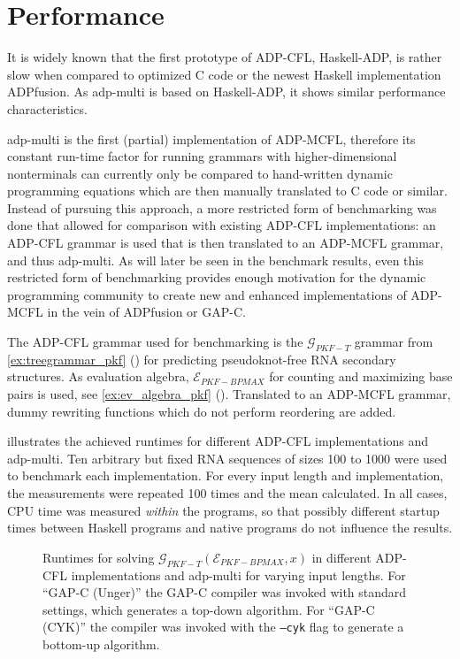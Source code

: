\documentclass[
    a4paper,
    12pt,
    twoside,
    BCOR=12mm,
    parskip=half,
    chapterprefix,
    numbers=noenddot,
    bibliography=totoc
]{scrbook}
\begin{document}
\section{Performance}
\label{sec:adpmulti_perf}

It is widely known that the first prototype of ADP-CFL, Haskell-ADP, is rather slow \citep{honer_zu_siederdissen_sneaking_2012} when compared to optimized C code or the newest Haskell implementation ADPfusion. As adp-multi is based on Haskell-ADP, it shows similar performance characteristics.

adp-multi is the first (partial) implementation of ADP-MCFL, therefore its constant run-time factor for running grammars with higher-dimensional nonterminals can currently only be compared to hand-written dynamic programming equations which are then manually translated to C code or similar. Instead of pursuing this approach, a more restricted form of benchmarking was done that allowed for comparison with existing ADP-CFL implementations: an ADP-CFL grammar is used that is then translated to an ADP-MCFL grammar, and thus adp-multi. As will later be seen in the benchmark results, even this restricted form of benchmarking provides enough motivation for the dynamic programming community to create new and enhanced implementations of ADP-MCFL in the vein of ADPfusion or GAP-C.

The ADP-CFL grammar used for benchmarking is the $\mathcal{G}_{PKF-T}$ grammar from \cref{ex:treegrammar_pkf} () for predicting pseudoknot-free RNA secondary structures. As evaluation algebra, $\mathcal{E}_{PKF-BPMAX}$ for counting and maximizing base pairs is used, see \cref{ex:ev_algebra_pkf} (). Translated to an ADP-MCFL grammar, dummy rewriting functions which do not perform reordering are added.

 illustrates the achieved runtimes for different ADP-CFL implementations and adp-multi. Ten arbitrary but fixed RNA sequences of sizes 100 to 1000 were used to benchmark each implementation. For every input length and implementation, the measurements were repeated 100 times and the mean calculated. In all cases, CPU time was measured \emph{within} the programs, so that possibly different startup times between Haskell programs and native programs do not influence the results.

\begin{figure}
	\centering
		
	\caption[Runtimes for solving $\mathcal{G}_{PKF-T}(\mathcal{E}_{PKF-BPMAX},x)$ in different ADP implementations]{Runtimes for solving $\mathcal{G}_{PKF-T}(\mathcal{E}_{PKF-BPMAX},x)$ in different ADP-CFL implementations and adp-multi for varying input lengths. For ``GAP-C (Unger)'' the GAP-C compiler was invoked with standard settings, which generates a top-down algorithm. For ``GAP-C (CYK)'' the compiler was invoked with the \texttt{--cyk} flag to generate a bottom-up algorithm.}
	\label{fig:benchmark}
\end{figure}
\end{document}
